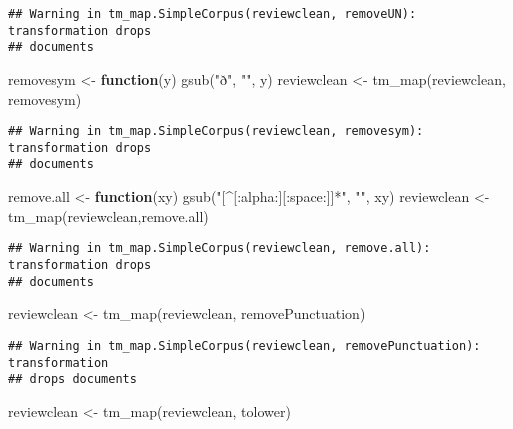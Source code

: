 \documentclass[
]{article}
\newenvironment{Shaded}{\begin{snugshade}}{\end{snugshade}}
\newcommand{\ControlFlowTok}[1]{\textcolor[rgb]{0.13,0.29,0.53}{\textbf{#1}}}
\newcommand{\FunctionTok}[1]{\textcolor[rgb]{0.00,0.00,0.00}{#1}}
\newcommand{\NormalTok}[1]{#1}
\newcommand{\OtherTok}[1]{\textcolor[rgb]{0.56,0.35,0.01}{#1}}
\newcommand{\StringTok}[1]{\textcolor[rgb]{0.31,0.60,0.02}{#1}}
\begin{document}
\begin{verbatim}
## Warning in tm_map.SimpleCorpus(reviewclean, removeUN): transformation drops
## documents
\end{verbatim}

\begin{Shaded}
\begin{Highlighting}[]
\NormalTok{removesym }\OtherTok{\textless{}{-}} \ControlFlowTok{function}\NormalTok{(y) }\FunctionTok{gsub}\NormalTok{(}\StringTok{"ð"}\NormalTok{, }\StringTok{""}\NormalTok{, y)}
\NormalTok{reviewclean }\OtherTok{\textless{}{-}} \FunctionTok{tm\_map}\NormalTok{(reviewclean, removesym)}
\end{Highlighting}
\end{Shaded}

\begin{verbatim}
## Warning in tm_map.SimpleCorpus(reviewclean, removesym): transformation drops
## documents
\end{verbatim}

\begin{Shaded}
\begin{Highlighting}[]
\NormalTok{remove.all }\OtherTok{\textless{}{-}} \ControlFlowTok{function}\NormalTok{(xy) }\FunctionTok{gsub}\NormalTok{(}\StringTok{"[\^{}[:alpha:][:space:]]*"}\NormalTok{, }\StringTok{""}\NormalTok{, xy)}
\NormalTok{reviewclean }\OtherTok{\textless{}{-}} \FunctionTok{tm\_map}\NormalTok{(reviewclean,remove.all)}
\end{Highlighting}
\end{Shaded}

\begin{verbatim}
## Warning in tm_map.SimpleCorpus(reviewclean, remove.all): transformation drops
## documents
\end{verbatim}

\begin{Shaded}
\begin{Highlighting}[]
\NormalTok{reviewclean }\OtherTok{\textless{}{-}} \FunctionTok{tm\_map}\NormalTok{(reviewclean, removePunctuation)}
\end{Highlighting}
\end{Shaded}

\begin{verbatim}
## Warning in tm_map.SimpleCorpus(reviewclean, removePunctuation): transformation
## drops documents
\end{verbatim}

\begin{Shaded}
\begin{Highlighting}[]
\NormalTok{reviewclean }\OtherTok{\textless{}{-}} \FunctionTok{tm\_map}\NormalTok{(reviewclean, tolower)}
\end{Highlighting}
\end{Shaded}
\end{document}
